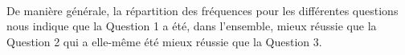 \documentclass[a4paper,11pt]{article}
\begin{document}
\paragraph{}
De manière générale, la répartition des fréquences pour les différentes questions nous indique que la Question 1 a été, dans l'ensemble, mieux réussie que la Question 2 qui a elle-même été mieux réussie que la Question 3.

\begin{figure}[h]
	\center

\end{figure}
\end{document}
